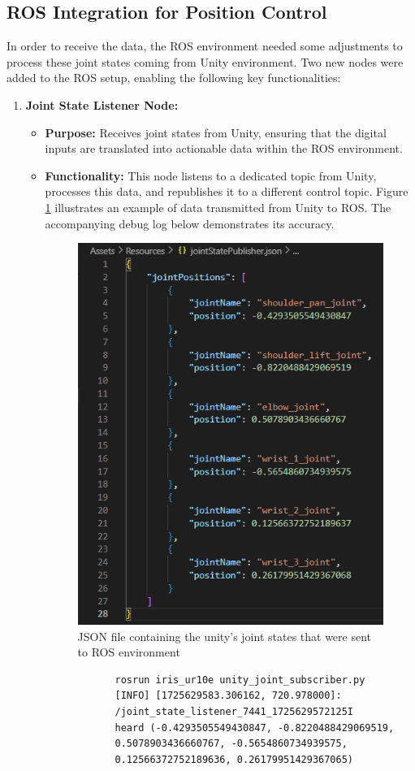     \subsection{ROS Integration for Position Control}
    In order to receive the data, the ROS environment needed some adjustments to process these joint states coming from Unity environment. Two new nodes were added to the ROS setup, enabling the following key functionalities:
    \begin{enumerate}
        \item \textbf{Joint State Listener Node:}
        \begin{itemize}
            \item \textbf{Purpose:} Receives joint states from Unity, ensuring that the digital inputs are translated into actionable data within the ROS environment.
            \item \textbf{Functionality:} This node listens to a dedicated topic from Unity, processes this data, and republishes it to a different control topic. Figure \ref{fig:json_sent_ros} illustrates an example of data transmitted from Unity to ROS. The accompanying debug log below demonstrates its accuracy.
    \begin{figure}
        \centering
        \includegraphics[width=0.5\linewidth]{figs/json_publisher_14h25.png}
        \caption{JSON file containing the unity's joint states that were sent to ROS environment}
        \label{fig:json_sent_ros}
    \end{figure}
    \begin{verbatim}
            rosrun iris_ur10e unity_joint_subscriber.py 
            [INFO] [1725629583.306162, 720.978000]: 
            /joint_state_listener_7441_1725629572125I 
            heard (-0.4293505549430847, -0.8220488429069519,
            0.5078903436660767, -0.5654860734939575,
            0.12566372752189636, 0.26179951429367065)
    \end{verbatim}
        \end{itemize}
    

\end{enumerate}
